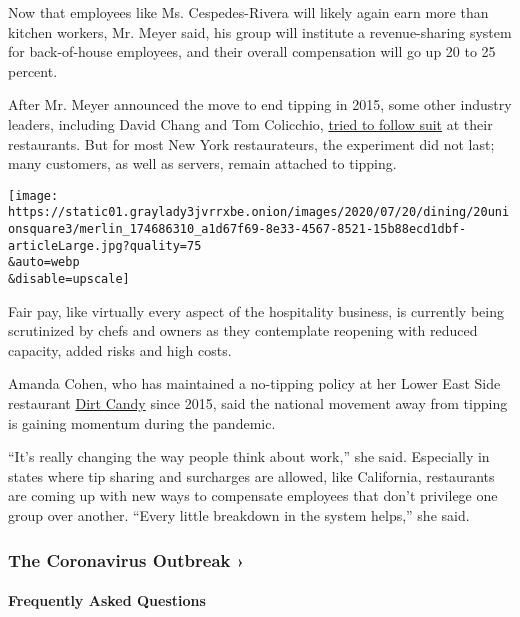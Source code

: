 Now that employees like Ms. Cespedes-Rivera will likely again earn more
than kitchen workers, Mr. Meyer said, his group will institute a
revenue-sharing system for back-of-house employees, and their overall
compensation will go up 20 to 25 percent.

After Mr. Meyer announced the move to end tipping in 2015, some other
industry leaders, including David Chang and Tom Colicchio,
\href{https://www.newyorker.com/culture/annals-of-gastronomy/the-limitations-of-american-restaurants-no-tipping-experiment}{tried
to follow suit} at their restaurants. But for most New York
restaurateurs, the experiment did not last; many customers, as well as
servers, remain attached to tipping.

\texttt{[image: https://static01.graylady3jvrrxbe.onion/images/2020/07/20/dining/20unionsquare3/merlin\_174686310\_a1d67f69-8e33-4567-8521-15b88ecd1dbf-articleLarge.jpg?quality=75\\\&auto=webp\\\&disable=upscale]}

Fair pay, like virtually every aspect of the hospitality business, is
currently being scrutinized by chefs and owners as they contemplate
reopening with reduced capacity, added risks and high costs.

Amanda Cohen, who has maintained a no-tipping policy at her Lower East
Side restaurant \href{https://www.dirtcandynyc.com/}{Dirt Candy} since
2015, said the national movement away from tipping is gaining momentum
during the pandemic.

``It's really changing the way people think about work,'' she said.
Especially in states where tip sharing and surcharges are allowed, like
California, restaurants are coming up with new ways to compensate
employees that don't privilege one group over another. ``Every little
breakdown in the system helps,'' she said.

\href{https://www.nytimes3xbfgragh.onion/news-event/coronavirus?action=click\&pgtype=Article\&state=default\&region=MAIN_CONTENT_3\&context=storylines_faq}{}

\hypertarget{the-coronavirus-outbreak-}{%
\subsubsection{The Coronavirus Outbreak
›}\label{the-coronavirus-outbreak-}}

\hypertarget{frequently-asked-questions}{%
\paragraph{Frequently Asked
Questions}\label{frequently-asked-questions}}

